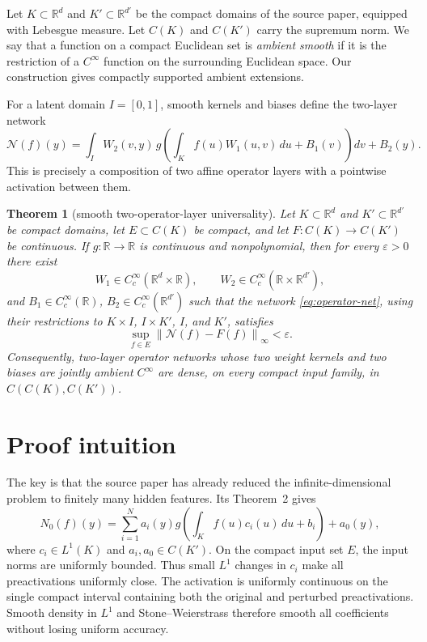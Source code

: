 \documentclass[11pt]{article}
\newtheorem{theorem}{Theorem}
\newcommand{\R}{\mathbb{R}}
\newcommand{\norm}[1]{\left\lVert #1\right\rVert}
\begin{document}
Let $K\subset\R^d$ and $K'\subset\R^{d'}$ be the compact domains of the
source paper, equipped with Lebesgue measure.  Let $C(K)$ and $C(K')$ carry
the supremum norm.  We say that a function on a compact Euclidean set is
\emph{ambient smooth} if it is the restriction of a $C^\infty$ function on
the surrounding Euclidean space.  Our construction gives compactly supported
ambient extensions.

For a latent domain $I=[0,1]$, smooth kernels and biases define the two-layer
network
\begin{equation}\label{eq:operator-net}
 \mathcal{N}(f)(y)
 =\int_I W_2(v,y)\,
 g\!\left(\int_K f(u)W_1(u,v)\,du+B_1(v)\right)dv+B_2(y).
\end{equation}
This is precisely a composition of two affine operator layers with a
pointwise activation between them.

\begin{theorem}[smooth two-operator-layer universality]\label{thm:main}
Let $K\subset\R^d$ and $K'\subset\R^{d'}$ be compact domains, let
$E\subset C(K)$ be compact, and let $F:C(K)\to C(K')$ be continuous.  If
$g:\R\to\R$ is continuous and nonpolynomial, then for every $\varepsilon>0$
there exist
\[
 W_1\in C_c^\infty(\R^d\times\R),\qquad
 W_2\in C_c^\infty(\R\times\R^{d'}),
\]
and $B_1\in C_c^\infty(\R)$, $B_2\in C_c^\infty(\R^{d'})$ such that the
network \eqref{eq:operator-net}, using their restrictions to
$K\times I$, $I\times K'$, $I$, and $K'$, satisfies
\[
 \sup_{f\in E}\norm{\mathcal{N}(f)-F(f)}_\infty<\varepsilon.
\]
Consequently, two-layer operator networks whose two weight kernels and two
biases are jointly ambient $C^\infty$ are dense, on every compact input
family, in $C(C(K),C(K'))$.
\end{theorem}

\section{Proof intuition}

The key is that the source paper has already reduced the infinite-dimensional
problem to finitely many hidden features.  Its Theorem~2 gives
\[
 N_0(f)(y)=\sum_{i=1}^N a_i(y)
 g\!\left(\int_K f(u)c_i(u)\,du+b_i\right)+a_0(y),
\]
where $c_i\in L^1(K)$ and $a_i,a_0\in C(K')$.  On the compact input set $E$,
the input norms are uniformly bounded.  Thus small $L^1$ changes in $c_i$
make all preactivations uniformly close.  The activation is uniformly
continuous on the single compact interval containing both the original and
perturbed preactivations.  Smooth density in $L^1$ and Stone--Weierstrass
therefore smooth all coefficients without losing uniform accuracy.
\end{document}
